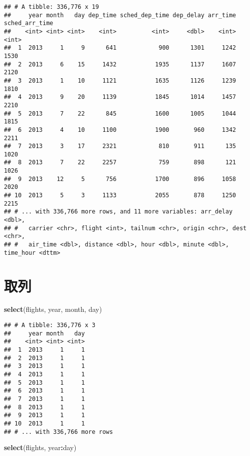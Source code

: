 \documentclass[
]{article}
\newenvironment{Shaded}{\begin{snugshade}}{\end{snugshade}}
\newcommand{\KeywordTok}[1]{\textcolor[rgb]{0.13,0.29,0.53}{\textbf{#1}}}
\newcommand{\NormalTok}[1]{#1}
\newcommand{\OperatorTok}[1]{\textcolor[rgb]{0.81,0.36,0.00}{\textbf{#1}}}
\begin{document}
\begin{verbatim}
## # A tibble: 336,776 x 19
##     year month   day dep_time sched_dep_time dep_delay arr_time sched_arr_time
##    <int> <int> <int>    <int>          <int>     <dbl>    <int>          <int>
##  1  2013     1     9      641            900      1301     1242           1530
##  2  2013     6    15     1432           1935      1137     1607           2120
##  3  2013     1    10     1121           1635      1126     1239           1810
##  4  2013     9    20     1139           1845      1014     1457           2210
##  5  2013     7    22      845           1600      1005     1044           1815
##  6  2013     4    10     1100           1900       960     1342           2211
##  7  2013     3    17     2321            810       911      135           1020
##  8  2013     7    22     2257            759       898      121           1026
##  9  2013    12     5      756           1700       896     1058           2020
## 10  2013     5     3     1133           2055       878     1250           2215
## # ... with 336,766 more rows, and 11 more variables: arr_delay <dbl>,
## #   carrier <chr>, flight <int>, tailnum <chr>, origin <chr>, dest <chr>,
## #   air_time <dbl>, distance <dbl>, hour <dbl>, minute <dbl>, time_hour <dttm>
\end{verbatim}

\hypertarget{ux53d6ux5217}{%
\section{取列}\label{ux53d6ux5217}}

\begin{Shaded}
\begin{Highlighting}[]
\KeywordTok{select}\NormalTok{(flights, year, month, day)}
\end{Highlighting}
\end{Shaded}

\begin{verbatim}
## # A tibble: 336,776 x 3
##     year month   day
##    <int> <int> <int>
##  1  2013     1     1
##  2  2013     1     1
##  3  2013     1     1
##  4  2013     1     1
##  5  2013     1     1
##  6  2013     1     1
##  7  2013     1     1
##  8  2013     1     1
##  9  2013     1     1
## 10  2013     1     1
## # ... with 336,766 more rows
\end{verbatim}

\begin{Shaded}
\begin{Highlighting}[]
\KeywordTok{select}\NormalTok{(flights, year}\OperatorTok{:}\NormalTok{day)}
\end{Highlighting}
\end{Shaded}
\end{document}
